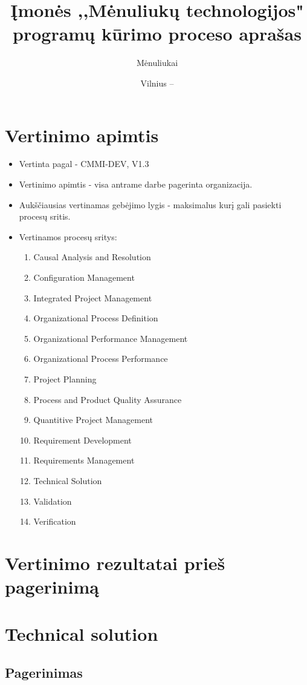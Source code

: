 \documentclass{VUMIFPSkursinis}
\title{Įmonės ,,Mėnuliukų technologijos" programų kūrimo proceso aprašas}
\author{Mėnuliukai}
\date{Vilnius – \the\year}
\begin{document}
\maketitle

\tableofcontents
	\section{Vertinimo apimtis}
		\begin{itemize}
			\item{Vertinta pagal - CMMI-DEV, V1.3}
			\item{Vertinimo apimtis - visa antrame darbe pagerinta organizacija.}
			\item{Aukščiausias vertinamas gebėjimo lygis - maksimalus kurį gali pasiekti procesų sritis.}
			\item{Vertinamos procesų sritys:
				\begin{enumerate}
					\item{Causal Analysis and Resolution}
					\item{Configuration Management}
					\item{Integrated Project Management}
					\item{Organizational Process Definition}
					\item{Organizational Performance Management}
					\item{Organizational Process Performance}
					\item{Project Planning}
					\item{Process and Product Quality Assurance}
					\item{Quantitive Project Management}
					\item{Requirement Development}
					\item{Requirements Management}
					\item{Technical Solution}
					\item{Validation}
					\item{Verification}
				\end{enumerate}
			}
		\end{itemize}
	\section{Vertinimo rezultatai prieš pagerinimą}
	\section{Technical solution}
		\subsection{Pagerinimas}
\end{document}
